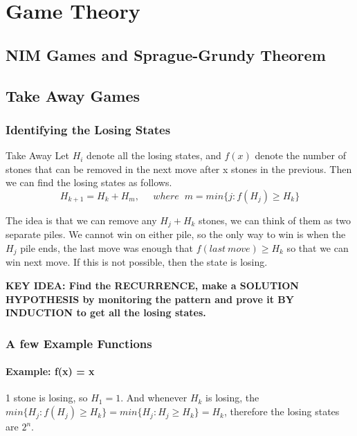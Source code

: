 \chapter{Game Theory}



\section{NIM Games and Sprague-Grundy Theorem}



\section{Take Away Games}


\subsection{Identifying the Losing States}

\begin{theorem}{Take Away}
  Let $H_i$ denote all the losing states, and $f(x)$ denote the number of stones that can be removed in the next move after x stones in the previous. Then we can find the losing states as follows.
  \begin{equation}
    H_{k+1} = H_k + H_m, \;\;\;\;\; where \;\; m = min \{j: f(H_j) \geq H_k\}
  \end{equation}
\end{theorem}
The idea is that we can remove any $H_j + H_k$ stones, we can think of them as two separate piles. We cannot win on either pile, so the only way to win is when the $H_j$ pile ends, the last move was enough that $f(last\:move) \geq H_k$ so that we can win next move. If this is not possible, then the state is losing.

\textbf{KEY IDEA: Find the RECURRENCE, make a SOLUTION HYPOTHESIS by monitoring the pattern and prove it BY INDUCTION to get all the losing states.}


\subsection{A few Example Functions}

\subsubsection{Example: f(x) = x}
1 stone is losing, so $H_1 = 1$. And whenever $H_k$ is losing, the $min\{H_j : f(H_j) \geq H_k\} = min\{H_j : H_j \geq H_k\} = H_k$, therefore the losing states are $2^n$.
